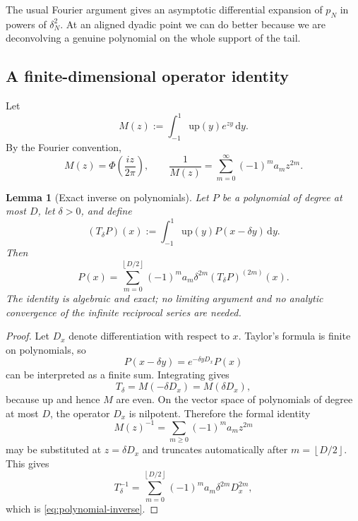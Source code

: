 \documentclass[11pt,oneside]{article}
\numberwithin{equation}{section}
\newtheorem{lemma}[theorem]{Lemma}
\theoremstyle{definition}
\theoremstyle{remark}
\newcommand{\upf}{\mathrm{up}}
\newcommand{\dd}{\,\mathrm{d}}
\newcommand{\floor}[1]{\left\lfloor #1\right\rfloor}
\begin{document}
The usual Fourier argument gives an asymptotic differential expansion of $p_N$
in powers of $\delta_N^2$.  At an aligned dyadic point we can do better because
we are deconvolving a genuine polynomial on the whole support of the tail.

\subsection{A finite-dimensional operator identity}

Let
\begin{equation}
 M(z):=\int_{-1}^{1}\upf(y)e^{zy}\dd y.
 \label{eq:moment-generating}
\end{equation}
By the Fourier convention,
\begin{equation}
 M(z)=\Phi\!\left(\frac{iz}{2\pi}\right),
 \qquad
 \frac1{M(z)}=\sum_{m=0}^{\infty}(-1)^ma_mz^{2m}.
 \label{eq:M-reciprocal}
\end{equation}

\begin{lemma}[Exact inverse on polynomials]
Let $P$ be a polynomial of degree at most $D$, let $\delta>0$, and define
\begin{equation}
 (T_\delta P)(x):=\int_{-1}^{1}\upf(y)P(x-\delta y)\dd y.
 \label{eq:Tdelta}
\end{equation}
Then
\begin{equation}
 \boxed{\displaystyle
 P(x)=\sum_{m=0}^{\floor{D/2}}(-1)^ma_m\delta^{2m}
 (T_\delta P)^{(2m)}(x).}
 \label{eq:polynomial-inverse}
\end{equation}
The identity is algebraic and exact; no limiting argument and no analytic
convergence of the infinite reciprocal series are needed.
\end{lemma}

\begin{proof}
Let $D_x$ denote differentiation with respect to $x$.  Taylor's formula is finite
on polynomials, so
\[
 P(x-\delta y)=e^{-\delta yD_x}P(x)
\]
can be interpreted as a finite sum.  Integrating gives
\[
 T_\delta=M(-\delta D_x)=M(\delta D_x),
\]
because $\upf$ and hence $M$ are even.  On the vector space of polynomials of
degree at most $D$, the operator $D_x$ is nilpotent.  Therefore the formal
identity
\[
 M(z)^{-1}=\sum_{m\ge0}(-1)^ma_mz^{2m}
\]
may be substituted at $z=\delta D_x$ and truncates automatically after
$m=\floor{D/2}$.  This gives
\[
 T_\delta^{-1}=\sum_{m=0}^{\floor{D/2}}
 (-1)^ma_m\delta^{2m}D_x^{2m},
\]
which is \eqref{eq:polynomial-inverse}.
\end{proof}
\end{document}
